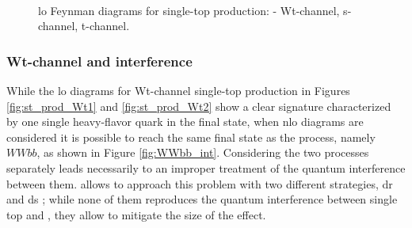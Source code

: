 \begin{figure}[h]
\centering 
{}
 \\
\caption{\Gls{lo} Feynman diagrams for single-top production: - Wt-channel,  
 s-channel,  t-channel.}\label{fig:single_top_prod}
\end{figure}

\subsubsection*{Wt-channel and \ttbar interference}

While the \gls{lo} diagrams for Wt-channel single-top production in Figures \ref{fig:st_prod_Wt1} and \ref{fig:st_prod_Wt2} show a clear signature characterized by one single heavy-flavor quark in the final state,
when \gls{nlo} diagrams are considered it is possible to reach the same final state as the \ttbar process, namely $WWbb$, as shown in Figure \ref{fig:WWbb_int}. 
Considering the two processes separately leads necessarily to an improper treatment of the quantum interference between them.
\PowhegBox allows to approach this problem with two different strategies, \gls{dr} and \gls{ds} \cite{Frixione:2005vw}; while none of them reproduces the quantum interference between single top and \ttbar, they allow to mitigate the size of the effect. 

